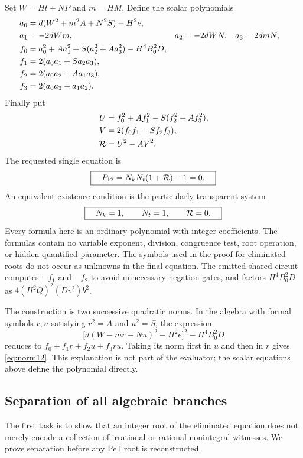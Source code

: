 Set $W=Ht+NP$ and $m=HM$. Define the scalar polynomials
\begin{align}
 a_0&=d(W^2+m^2A+N^2S)-H^2e,\notag\\
 a_1&=-2dWm,&a_2&=-2dWN,&a_3&=2dmN,\label{eq:normcoeff1}\\
 f_0&=a_0^2+Aa_1^2+S(a_2^2+Aa_3^2)-H^4B_0^2D,\notag\\
 f_1&=2(a_0a_1+Sa_2a_3),\notag\\
 f_2&=2(a_0a_2+Aa_1a_3),\notag\\
 f_3&=2(a_0a_3+a_1a_2).\label{eq:normcoeff2}
\end{align}
Finally put
\begin{align}
 U&=f_0^2+Af_1^2-S(f_2^2+Af_3^2),\notag\\
 V&=2(f_0f_1-Sf_2f_3),\notag\\
 \mathcal R&=U^2-AV^2.\label{eq:norm12}
\end{align}
The requested single equation is
\begin{equation}
 \boxed{\quad P_{12}=N_kN_t(1+\mathcal R)-1=0.\quad}\label{eq:final12}
\end{equation}
An equivalent existence condition is the particularly transparent system
\begin{equation}
 \boxed{\quad N_k=1,\qquad N_t=1,\qquad \mathcal R=0.\quad}
 \label{eq:system12}
\end{equation}
Every formula here is an ordinary polynomial with integer coefficients.
The formulas contain no variable exponent, division, congruence test,
root operation, or hidden quantified parameter. The symbols used in the
proof for eliminated roots do not occur as unknowns in the final equation.
The emitted shared circuit computes $-f_1$ and $-f_2$
to avoid unnecessary negation gates, and factors
$H^4B_0^2D$ as $4(H^2Q)^2(Dv^2)b^2$.

The construction is two successive quadratic norms. In the algebra with
formal symbols $r,u$ satisfying $r^2=A$ and $u^2=S$, the expression
\[
 \bigl[d(W-mr-Nu)^2-H^2e\bigr]^2-H^4B_0^2D
\]
reduces to $f_0+f_1r+f_2u+f_3ru$. Taking its norm first in $u$ and then in
$r$ gives \eqref{eq:norm12}. This explanation is not part of the evaluator;
the scalar equations above define the polynomial directly.

\subsection{Separation of all algebraic branches}

The first task is to show that an integer root of the eliminated equation
does not merely encode a collection of irrational or rational nonintegral
witnesses. We prove separation before any Pell root is reconstructed.

